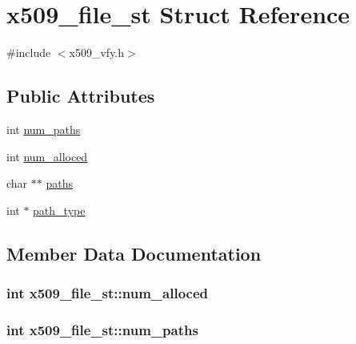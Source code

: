 \hypertarget{structx509__file__st}{}\section{x509\+\_\+file\+\_\+st Struct Reference}
\label{structx509__file__st}


{\ttfamily \#include $<$x509\+\_\+vfy.\+h$>$}

\subsection*{Public Attributes}
\begin{DoxyCompactItemize}
\item 
int \hyperlink{structx509__file__st_a625533740392eada26b9522bfc5f563f}{num\+\_\+paths}
\item 
int \hyperlink{structx509__file__st_a74ca798c37b4f0c937d6392d1a06eb97}{num\+\_\+alloced}
\item 
char $\ast$$\ast$ \hyperlink{structx509__file__st_aa90fe6de68309d7572b7516787bf235f}{paths}
\item 
int $\ast$ \hyperlink{structx509__file__st_a2ecd2de35656eb382770bcb7317cb3f4}{path\+\_\+type}
\end{DoxyCompactItemize}


\subsection{Member Data Documentation}
\subsubsection[{\texorpdfstring{num\+\_\+alloced}{num_alloced}}]{\setlength{\rightskip}{0pt plus 5cm}int x509\+\_\+file\+\_\+st\+::num\+\_\+alloced}\hypertarget{structx509__file__st_a74ca798c37b4f0c937d6392d1a06eb97}{}\label{structx509__file__st_a74ca798c37b4f0c937d6392d1a06eb97}
\subsubsection[{\texorpdfstring{num\+\_\+paths}{num_paths}}]{\setlength{\rightskip}{0pt plus 5cm}int x509\+\_\+file\+\_\+st\+::num\+\_\+paths}\hypertarget{structx509__file__st_a625533740392eada26b9522bfc5f563f}{}\label{structx509__file__st_a625533740392eada26b9522bfc5f563f}

